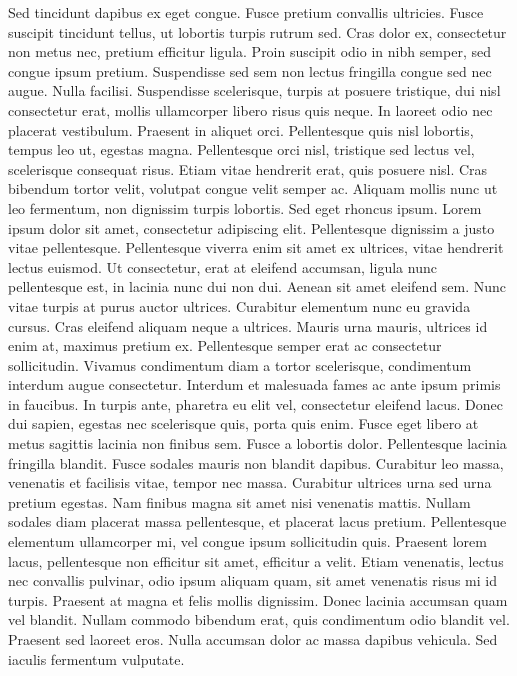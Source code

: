 \documentclass{article}
\begin{document}
Sed tincidunt dapibus ex eget congue. Fusce pretium convallis ultricies. Fusce suscipit tincidunt tellus, ut lobortis turpis rutrum sed. Cras dolor ex, consectetur non metus nec, pretium efficitur ligula. Proin suscipit odio in nibh semper, sed congue ipsum pretium. Suspendisse sed sem non lectus fringilla congue sed nec augue. Nulla facilisi. Suspendisse scelerisque, turpis at posuere tristique, dui nisl consectetur erat, mollis ullamcorper libero risus quis neque. In laoreet odio nec placerat vestibulum. Praesent in aliquet orci. Pellentesque quis nisl lobortis, tempus leo ut, egestas magna. Pellentesque orci nisl, tristique sed lectus vel, scelerisque consequat risus. Etiam vitae hendrerit erat, quis posuere nisl. Cras bibendum tortor velit, volutpat congue velit semper ac. Aliquam mollis nunc ut leo fermentum, non dignissim turpis lobortis. Sed eget rhoncus ipsum.
Lorem ipsum dolor sit amet, consectetur adipiscing elit. Pellentesque dignissim a justo vitae pellentesque. Pellentesque viverra enim sit amet ex ultrices, vitae hendrerit lectus euismod. Ut consectetur, erat at eleifend accumsan, ligula nunc pellentesque est, in lacinia nunc dui non dui. Aenean sit amet eleifend sem. Nunc vitae turpis at purus auctor ultrices. Curabitur elementum nunc eu gravida cursus. Cras eleifend aliquam neque a ultrices. Mauris urna mauris, ultrices id enim at, maximus pretium ex. Pellentesque semper erat ac consectetur sollicitudin. Vivamus condimentum diam a tortor scelerisque, condimentum interdum augue consectetur. Interdum et malesuada fames ac ante ipsum primis in faucibus. In turpis ante, pharetra eu elit vel, consectetur eleifend lacus. Donec dui sapien, egestas nec scelerisque quis, porta quis enim. Fusce eget libero at metus sagittis lacinia non finibus sem. Fusce a lobortis dolor.
Pellentesque lacinia fringilla blandit. Fusce sodales mauris non blandit dapibus. Curabitur leo massa, venenatis et facilisis vitae, tempor nec massa. Curabitur ultrices urna sed urna pretium egestas. Nam finibus magna sit amet nisi venenatis mattis. Nullam sodales diam placerat massa pellentesque, et placerat lacus pretium. Pellentesque elementum ullamcorper mi, vel congue ipsum sollicitudin quis. Praesent lorem lacus, pellentesque non efficitur sit amet, efficitur a velit. Etiam venenatis, lectus nec convallis pulvinar, odio ipsum aliquam quam, sit amet venenatis risus mi id turpis. Praesent at magna et felis mollis dignissim. Donec lacinia accumsan quam vel blandit. Nullam commodo bibendum erat, quis condimentum odio blandit vel. Praesent sed laoreet eros. Nulla accumsan dolor ac massa dapibus vehicula. Sed iaculis fermentum vulputate.
\end{document}
